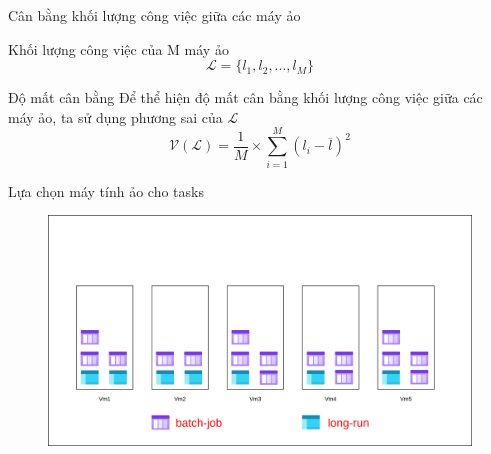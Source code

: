 \documentclass[11pt,xcolor={dvipsnames}, aspectratio=169]{beamer}
\begin{document}
\begin{frame}
{Cân bằng khối lượng công việc giữa các máy ảo}
\pause
\begin{block}
{Khối lượng công việc của M máy ảo}
\[
	\mathcal{L} = \{l_{1}, l_{2}, ..., l_{M}\}
\]
\end{block}
\begin{block}
{Độ mất cân bằng}
Để thể hiện độ mất cân bằng khối lượng công việc giữa các máy ảo, ta sử dụng phương sai của $\mathcal{L}$
\[
	\mathcal{V}(\mathcal{L}) = \frac{1}{M} \times \sum_{i = 1}^{M}(l_{i} - \overline{l})^{2}
\]
\end{block}
\end{frame}

\begin{frame}
{Lựa chọn máy tính ảo cho tasks}
	\begin{figure}
		\vspace{1cm}
		\includegraphics[scale=0.4]{images/balancing_tasks1.png}
	\end{figure}
\end{frame}
\end{document}
